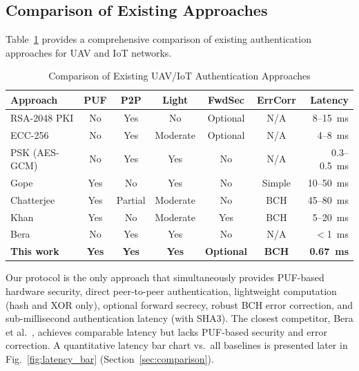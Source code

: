 \documentclass[11pt,a4paper]{article}
\begin{document}
\subsection{Comparison of Existing Approaches}

Table~\ref{tab:related_comparison} provides a comprehensive comparison of existing authentication approaches for UAV and IoT networks.

\begin{table}[H]
\centering
\caption{Comparison of Existing UAV/IoT Authentication Approaches}
\label{tab:related_comparison}
\small
\begin{tabular}{@{}p{2.8cm}cccccr@{}}
\toprule
\textbf{Approach} & \textbf{PUF} & \textbf{P2P} & \textbf{Light} & \textbf{FwdSec} & \textbf{ErrCorr} & \textbf{Latency} \\
\midrule
RSA-2048 PKI & No & Yes & No & Optional & N/A & 8--15~ms \\
ECC-256 & No & Yes & Moderate & Optional & N/A & 4--8~ms \\
PSK (AES-GCM) & No & Yes & Yes & No & N/A & 0.3--0.5~ms \\
Gope~\cite{puf_lightweight_uav} & Yes & No & Yes & No & Simple & 10--50~ms \\
Chatterjee~\cite{puf_uav_cross_domain} & Yes & Partial & Moderate & No & BCH & 45--80~ms \\
Khan~\cite{puf_6g_uav} & Yes & No & Moderate & Yes & BCH & 5--20~ms \\
Bera~\cite{peer2peer_auth} & No & Yes & Yes & No & N/A & $<$1~ms \\
\textbf{This work} & \textbf{Yes} & \textbf{Yes} & \textbf{Yes} & \textbf{Optional} & \textbf{BCH} & \textbf{0.67~ms} \\
\bottomrule
\end{tabular}
\normalsize
\end{table}

Our protocol is the only approach that simultaneously provides PUF-based hardware security, direct peer-to-peer authentication, lightweight computation (hash and XOR only), optional forward secrecy, robust BCH error correction, and sub-millisecond authentication latency (with SHA3). The closest competitor, Bera et al.~\cite{peer2peer_auth}, achieves comparable latency but lacks PUF-based security and error correction. A quantitative latency bar chart vs.\ all baselines is presented later in Fig.~\ref{fig:latency_bar} (Section~\ref{sec:comparison}).

\end{document}
